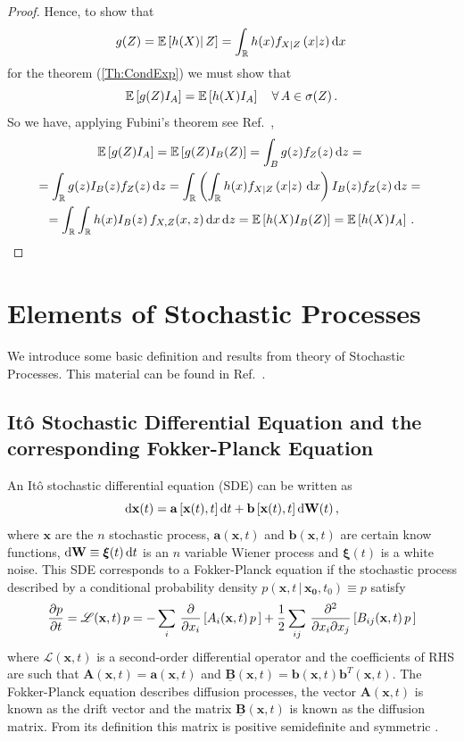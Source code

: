\documentclass[10pt,a4paper]{book}
\theoremstyle{definition}
\begin{document}
\begin{appendices}
\begin{proof}
\noindent
Hence, to show that 
$$
g(Z)=\mathbb{E}\left[ {h(X)} \middle\vert {\,Z} \right]=\int_{\mathbb{R}} h(x) f_{X\lvert Z}\left(x\lvert z\right)  \mbox{d} x\,
$$
for the theorem (\ref{Th:CondExp}) we must show that
$$
\mathbb{E}\left[ g(Z)I_{A} \right]=\mathbb{E}\left[ h(X)I_{A} \right]\quad\forall\,A\in\sigma(Z)\,.
$$
So we have, applying Fubini's theorem see Ref.~\cite[p.~77-79]{Williams1991},
\begin{multline*}
\mathbb{E}\left[ g(Z)I_{A} \right]=\mathbb{E}\left[ g(Z)I_B(Z) \right] = \int_B g(z)f_Z(z)\,\mbox{d} z ={}\\ 
 = \int_{\mathbb{R}} g(z)I_B(z)f_Z(z)\,\mbox{d} z =\int_{\mathbb{R}}\left(\int_{\mathbb{R}} h(x) f_{X\lvert Z}\left(x\lvert z\right)\,\mbox{d} x\right)I_B(z)f_Z(z) \,\mbox{d} z ={}\\
   = \int_{\mathbb{R}}\int_{\mathbb{R}} h(x)I_B(z)\,f_{X,Z}(x,z)\,\mbox{d} x\,\mbox{d} z = \mathbb{E}\left[ h(X)I_B(Z) \right]=\mathbb{E}\left[ h(X)I_{A} \right]\,.
\end{multline*}

\end{proof}


\chapter{Elements of Stochastic Processes}
\label{App:B}
We introduce some basic definition and results from theory of Stochastic Processes. This material can be found in Ref.~\cite{Gardiner2009,Pavliotis2014,Risk:TheFPeq}. 
\section{It\^o Stochastic Differential Equation and the corresponding Fokker-Planck Equation}
\label{Sec:SDE}
An It\^o stochastic differential equation (SDE) can be written as
\[
  \mbox{d} \mathbf{x}(t) = \mathbf{a} \left[\mathbf{x}(t),t\right] \mbox{d} t+\mathbf{b}\left[\mathbf{x}(t),t\right] \mbox{d} \mathbf{W}(t)\,,
\]
where $\mathbf{x}$ are the $n$ stochastic process, $\mathbf{a}(\mathbf{x},t)$ and $\mathbf{b}(\mathbf{x},t)$ are certain know functions, 
$ \mbox{d} \mathbf{W}\equiv \boldsymbol{\xi}(t)\,\mbox{d} t $ is an $n$ variable Wiener process and $\boldsymbol{\xi}(t)$ is a white noise. This SDE corresponds to a Fokker-Planck equation if the stochastic process described by a conditional probability density $p(\mathbf{x},t\,|\,\mathbf{x_0},t_0)\equiv p$ satisfy 
\[
  \frac{\partial p}{\partial t} = \mathscr{L}(\mathbf{x},t)\,p
     =-\sum_i\,\frac{\partial}{\partial x_i}\left[ A_i(\mathbf{x},t)\,p\, \right]
      +\frac{1}{2}\sum_{ij}\,\frac{\partial^2}{\partial x_i \partial x_j} \left[ B_{ij}(\mathbf{x},t)\,p\, \right] 
\]
where $\mathscr{L}(\mathbf{x},t)$ is a second-order differential operator and the coefficients of RHS are such that $\mathbf{A}(\mathbf{x},t)=\mathbf{a}(\mathbf{x},t)$ and $\underline{\mathbf{B}}(\mathbf{x},t)=\mathbf{b}(\mathbf{x},t)\textbf{b}^T(\mathbf{x},t)$. The Fokker-Planck equation describes diffusion processes, the vector $\mathbf{A}(\mathbf{x},t)$ is known as the drift vector and the matrix $\underline{\mathbf{B}}(\mathbf{x},t)$ is known as the diffusion matrix. From its definition this matrix is positive semidefinite and symmetric \cite{Gardiner2009}.


\end{appendices}
\end{document}
